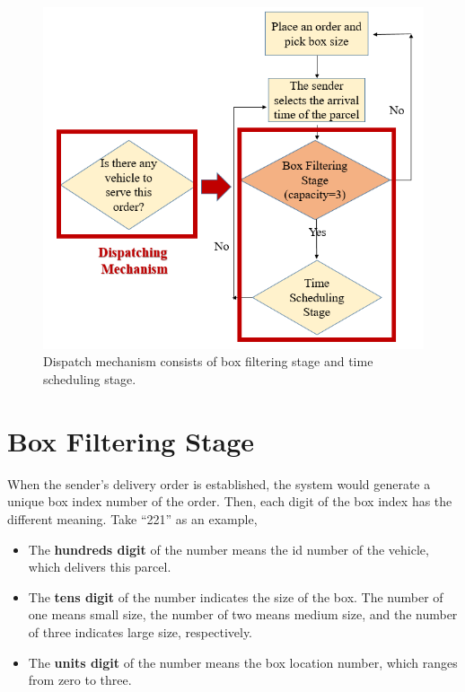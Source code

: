 \documentclass[12pt]{ksthesis}
\begin{document}
\begin{thesis}
{\begin{figure}[H]
\centering
\includegraphics[scale=0.7]{./Thesis_figures/F6-1_dispatching_mechanism.PNG}
\caption{\large Dispatch mechanism consists of box filtering stage and time scheduling stage.}
\vspace{0.5cm}
\label{Fig:Dispatch_mechanism}
\end{figure}

\section{Box Filtering Stage }
When the sender’s delivery order is established, the system would generate a unique box index number of the order. Then, each digit of the box index has the different meaning. Take “221” as an example,

\begin{itemize}


\item
The \textbf{hundreds digit} of the number means the id number of the vehicle, which delivers this parcel.

\item
The \textbf{tens digit} of the number indicates the size of the box. The number of one means small size, the number of two means medium size, and the number of three indicates large size, respectively.

\item
The \textbf{units digit} of the number means the box location number, which ranges from zero to three. 


\end{itemize}}
\end{thesis}
\end{document}
